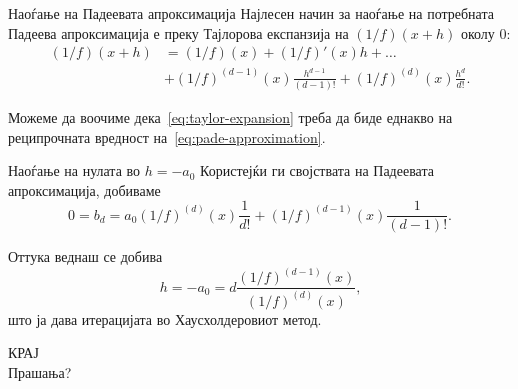 \documentclass[serif, xcolor={svgnames, table}, usepdftitle=false]{beamer}
\begin{document}
\begin{frame}{Наоѓање на Падеевата апроксимација}
  Најлесен начин за наоѓање на потребната Падеева апроксимација е преку
  Тајлорова експанзија на \((1 / {f})(x + h)\) околу \(0\):
  \begin{equation}\label{eq:taylor-expansion}
    \begin{aligned}
      (1 / {f})(x + h) &= (1 / {f})(x) + (1 / {f})'(x) h + \ldots \\
      &+ (1 / {f})^{(d - 1)}(x) \frac{h^{d - 1}}{(d - 1)!} + (1 / {f})^{(d)}(x)
      \frac{h^d}{d!}\text{.}
    \end{aligned}
  \end{equation}

  Можеме да воочиме дека~\alert{\eqref{eq:taylor-expansion} треба да биде
    еднакво на реципрочната вредност на~\eqref{eq:pade-approximation}}.
\end{frame}

\begin{frame}{Наоѓање на нулата во \(h = -a_0\)}
  Користејќи ги својствата на Падеевата апроксимација, добиваме
  \[
    0 = b_d = a_0 (1 / {f})^{(d)}(x) \frac{1}{d!} + (1 / {f})^{(d - 1)}(x)
    \frac{1}{(d - 1)!}\text{.}
  \]

  Оттука веднаш се добива
  \[
    h = -a_0 = d \frac{(1 / {f})^{(d - 1)}(x)}{(1 / {f})^{(d)}(x)}\text{,}
  \]
  што ја дава итерацијата во Хаусхолдеровиот метод.
\end{frame}

\begin{frame}[plain, c]
\begin{center}
  {\huge КРАЈ}\\
  Прашања?
\end{center}
\end{frame}
\end{document}
